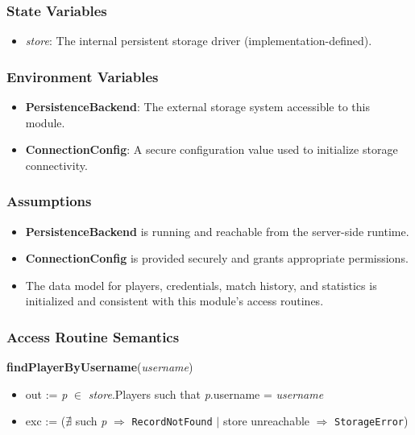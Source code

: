 \documentclass[12pt, titlepage]{article}
\begin{document}
\subsubsection{State Variables}
\begin{itemize}
    \item \textit{store}: The internal persistent storage driver (implementation-defined).
\end{itemize}

\subsubsection{Environment Variables}
\begin{itemize}
    \item \textbf{PersistenceBackend}: The external storage system accessible to this module.
    \item \textbf{ConnectionConfig}: A secure configuration value used to initialize storage connectivity.
\end{itemize}

\subsubsection{Assumptions}
\begin{itemize}
    \item \textbf{PersistenceBackend} is running and reachable from the server-side runtime.
    \item \textbf{ConnectionConfig} is provided securely and grants appropriate permissions.
    \item The data model for players, credentials, match history, and statistics is initialized and consistent with this module's access routines.
\end{itemize}

\subsubsection{Access Routine Semantics}

\noindent\textbf{findPlayerByUsername}(\textit{username})
\begin{itemize}
    \item out := \textit{p} $\in$ \textit{store}.Players such that \textit{p}.username = \textit{username}
    \item exc := ($\nexists$ such \textit{p} $\Rightarrow$ \texttt{RecordNotFound} $|$ store unreachable $\Rightarrow$ \texttt{StorageError})
\end{itemize}
\end{document}
